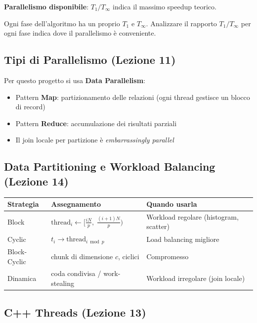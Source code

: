 \documentclass[11pt,a4paper]{article}
\begin{document}
\textbf{Parallelismo disponibile}: $T_1/T_\infty$ indica il massimo speedup teorico.

\begin{notebox}
Ogni fase dell'algoritmo ha un proprio $T_1$ e $T_\infty$. Analizzare il rapporto $T_1/T_\infty$ per ogni fase indica dove il parallelismo è conveniente.
\end{notebox}

\subsection{Tipi di Parallelismo (Lezione 11)}

Per questo progetto si usa \textbf{Data Parallelism}:
\begin{itemize}[nosep]
  \item Pattern \textbf{Map}: partizionamento delle relazioni (ogni thread gestisce un blocco di record)
  \item Pattern \textbf{Reduce}: accumulazione dei risultati parziali
  \item Il join locale per partizione è \emph{embarrassingly parallel}
\end{itemize}

\subsection{Data Partitioning e Workload Balancing (Lezione 14)}

\begin{center}
\begin{tabular}{lll}
\toprule
\textbf{Strategia} & \textbf{Assegnamento} & \textbf{Quando usarla}\\\midrule
Block & $\text{thread}_i \gets [\frac{iN}{p},\;\frac{(i+1)N}{p})$ & Workload regolare (histogram, scatter)\\
Cyclic & $t_i \to \text{thread}_{i \bmod p}$ & Load balancing migliore\\
Block-Cyclic & chunk di dimensione $c$, ciclici & Compromesso\\
Dinamica & coda condivisa / work-stealing & Workload irregolare (join locale)\\
\bottomrule
\end{tabular}
\end{center}

\subsection{C++ Threads (Lezione 13)}
\end{document}
